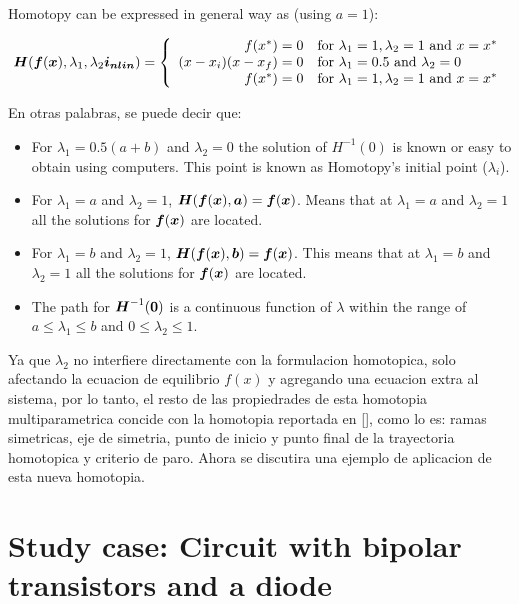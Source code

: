 \documentclass[conference,letterpaper,onecolumn]{IEEEtran}
\newcommand{\pig}[1]{\mbox{\boldmath ${#1}$}	}
\begin{document}
Homotopy can be expressed in general way as (using $a=1$):

\begin{displaymath}
\pig{H}(\pig{f}(\pig{x}),\lambda_1,\lambda_2\pig{i_{nlin}} ) = \left\{\begin{array}{rl}
f(x^*)=0 & \textrm{for  $\lambda_1=1, \lambda_2=1$ and $x=x^*$}\\
(x-x_i)(x-x_f)=0 & \textrm{for $\lambda_1=0.5$ and $\lambda_2=0$}\\
f(x^*)=0 & \textrm{for $\lambda_1=1, \lambda_2=1$ and $x=x^*$}
\end{array}\right.
\end{displaymath}


En otras palabras, se puede decir que:
\begin{itemize}
\item For $\lambda_1=0.5(a+b)$ and $\lambda_2=0$ the solution of $H^{-1}(0)$ is known or easy to obtain using computers. This point is known as Homotopy's initial point ($\lambda_i$).
\item For $\lambda_1=a$ and $\lambda_2=1$, $\pig{H}(\pig{f}(\pig{x}),\pig{a} )=\pig{f}(\pig{x})$. Means that at $\lambda_1=a$ and $\lambda_2=1$ all the solutions for $\pig{f}(\pig{x})$ are located.
\item For $\lambda_1=b$ and $\lambda_2=1$, $\pig{H}(\pig{f}(\pig{x}),\pig{b} )=\pig{f}(\pig{x})$. This means that at $\lambda_1=b$ and $\lambda_2=1$ all the solutions for $\pig{f}(\pig{x})$ are located.
\item The path for $\pig{H}^{-1}(\pig{0})$ is a continuous function of $\lambda$ within the range of $a \leq \lambda_1 \leq b $ and $0 \leq \lambda_2 \leq 1 $. 
\end{itemize}


Ya que $\lambda_2$ no interfiere directamente con la formulacion homotopica, solo afectando la ecuacion de equilibrio $f(x)$ y agregando una ecuacion extra al sistema, por lo tanto,
el resto de las propiedrades de esta homotopia multiparametrica concide con la homotopia reportada en [], como lo es: ramas simetricas, eje de simetria, punto de inicio
y punto final de la trayectoria homotopica y criterio de paro. Ahora se discutira una ejemplo de aplicacion de esta nueva homotopia.


\section{Study case: Circuit with bipolar transistors and a diode}
\end{document}

